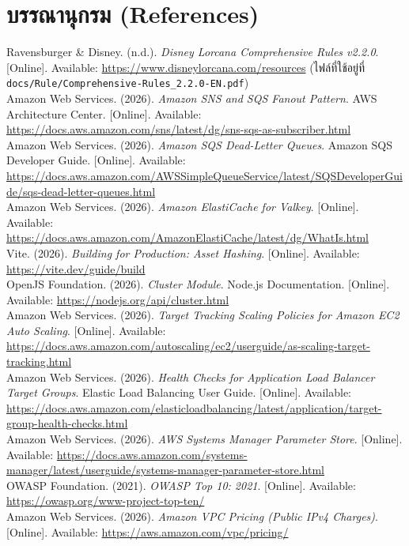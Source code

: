 \documentclass[12pt,a4paper]{report}
\begin{document}
\chapter*{บรรณานุกรม (References)}

\noindent [1] Ravensburger \& Disney. (n.d.). \textit{Disney Lorcana Comprehensive Rules v2.2.0}. [Online]. Available: \url{https://www.disneylorcana.com/resources} (ไฟล์ที่ใช้อยู่ที่ \nolinkurl{docs/Rule/Comprehensive-Rules_2.2.0-EN.pdf})\\[0.3cm]
\noindent [2] Amazon Web Services. (2026). \textit{Amazon SNS and SQS Fanout Pattern}. AWS Architecture Center. [Online]. Available: \url{https://docs.aws.amazon.com/sns/latest/dg/sns-sqs-as-subscriber.html}\\[0.3cm]
\noindent [3] Amazon Web Services. (2026). \textit{Amazon SQS Dead-Letter Queues}. Amazon SQS Developer Guide. [Online]. Available: \url{https://docs.aws.amazon.com/AWSSimpleQueueService/latest/SQSDeveloperGuide/sqs-dead-letter-queues.html}\\[0.3cm]
\noindent [4] Amazon Web Services. (2026). \textit{Amazon ElastiCache for Valkey}. [Online]. Available: \url{https://docs.aws.amazon.com/AmazonElastiCache/latest/dg/WhatIs.html}\\[0.3cm]
\noindent [5] Vite. (2026). \textit{Building for Production: Asset Hashing}. [Online]. Available: \url{https://vite.dev/guide/build}\\[0.3cm]
\noindent [6] OpenJS Foundation. (2026). \textit{Cluster Module}. Node.js Documentation. [Online]. Available: \url{https://nodejs.org/api/cluster.html}\\[0.3cm]
\noindent [7] Amazon Web Services. (2026). \textit{Target Tracking Scaling Policies for Amazon EC2 Auto Scaling}. [Online]. Available: \url{https://docs.aws.amazon.com/autoscaling/ec2/userguide/as-scaling-target-tracking.html}\\[0.3cm]
\noindent [8] Amazon Web Services. (2026). \textit{Health Checks for Application Load Balancer Target Groups}. Elastic Load Balancing User Guide. [Online]. Available: \url{https://docs.aws.amazon.com/elasticloadbalancing/latest/application/target-group-health-checks.html}\\[0.3cm]
\noindent [9] Amazon Web Services. (2026). \textit{AWS Systems Manager Parameter Store}. [Online]. Available: \url{https://docs.aws.amazon.com/systems-manager/latest/userguide/systems-manager-parameter-store.html}\\[0.3cm]
\noindent [10] OWASP Foundation. (2021). \textit{OWASP Top 10: 2021}. [Online]. Available: \url{https://owasp.org/www-project-top-ten/}\\[0.3cm]
\noindent [11] Amazon Web Services. (2026). \textit{Amazon VPC Pricing (Public IPv4 Charges)}. [Online]. Available: \url{https://aws.amazon.com/vpc/pricing/}
\end{document}
